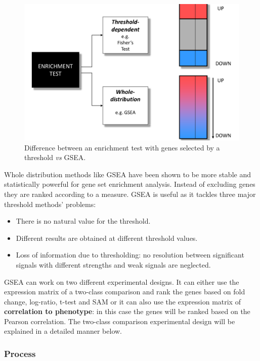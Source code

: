 	\begin{figure}[H]
		\centering
		\includegraphics[scale=0.2]{beyond}
		\caption{Difference between an enrichment test with genes selected by a threshold \textit{vs} GSEA.}
		\label{fig:beyond}
	\end{figure}

	Whole distribution methods like GSEA have been shown to be more stable and statistically powerful for gene set enrichment analysis.
	Instead of excluding genes they are ranked according to a measure.
	GSEA is useful as it tackles three major threshold methods' problems:

	\begin{multicols}{2}
		\begin{itemize}
			\item There is no natural value for the threshold.
			\item Different results are obtained at different threshold values.
			\item Loss of information due to thresholding: no resolution between significant signals with different strengths and weak signals are neglected.
		\end{itemize}
	\end{multicols}

	GSEA can work on two different experimental designs.
	It can either use the expression matrix of a two-class comparison and rank the genes based on fold change, log-ratio, t-test and SAM or it can also use the expression matrix of \textbf{correlation to phenotype}: in this case the genes will be ranked based on the Pearson correlation.
	The two-class comparison experimental design will be explained in a detailed manner below.

		\subsubsection{Process}


